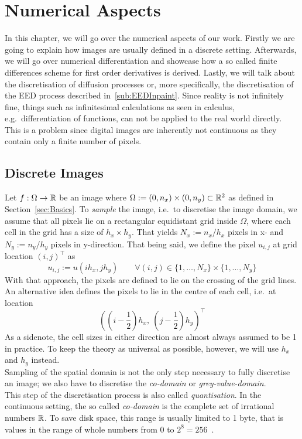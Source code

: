 \chapter{Numerical Aspects}\label{ch:Numerical} 
In this chapter, we will go over the numerical aspects of our work.
Firstly we are going to explain how images are usually defined in a discrete setting.
Afterwards, we will go over numerical differentiation and showcase how a so called
finite differences scheme for first order derivatives is derived. 
Lastly, we will talk about the discretisation of diffusion processes or, more specifically, the
discretisation of the EED process described in~\ref{sub:EEDInpaint}.
Since reality is not infinitely fine, things such as infinitesimal calculations as seen in 
calculus, e.g.\ differentiation of functions, can not be applied to the real world directly.
This is a problem since digital images are inherently not continuous as they contain only a
finite number of pixels. 

\section{Discrete Images}\label{sec:DiscreteImages}
Let $f:\Omega \rightarrow \mathbb{R}$ be an image where $\Omega
:= (0, n_x)\times(0, n_y) \subset \mathbb{R}^2$ as defined in Section~\ref{sec:Basics}. To
\textit{sample} the image, i.e.\ to discretise the image domain, we assume that all pixels lie on a
rectangular equidistant grid inside $\Omega$, where each cell in the grid has a size of $h_x
\times h_y$.
That yields $N_x := n_x/h_x$ pixels in x- and $N_y := n_y/h_y$ pixels in
y-direction.
That being said, we define the pixel $u_{i,j}$ at grid location ${(i, j)}^\top$ as
\begin{equation}
    u_{i, j} := u(ih_x, jh_y)\qquad \forall(i ,j) \in \{1,\dots,N_x\}\times\{1,\dots,N_y\}
\end{equation}
With that approach, the pixels are defined to lie on the crossing of the grid lines.
An alternative idea defines the pixels to lie in the centre of each cell, i.e.\ at location 
\begin{equation}
    {\left(\left(i-\frac{1}{2}\right)h_x,\ \left(j- \frac{1}{2}\right)h_y\right)}^\top
\end{equation}
As a sidenote, the cell sizes in either direction are almost always assumed to be 1 in 
practice. 
To keep the theory as universal as possible, however, we will use $h_x$ and $h_y$ instead.\\
Sampling of the spatial domain is not the only step necessary to fully discretise an image; we also have
to discretise the \textit{co-domain} or \textit{grey-value-domain}.\\
This step of the discretisation process is also called \textit{quantisation}.
In the continuous setting, the so called \textit{co-domain} is the complete set of irrational numbers $\mathbb{R}$.
To save disk space, this range is usually limited to 1 byte, that is values in the range 
of whole numbers from 0 to $2^8=256$~\cite{ipcv}.

